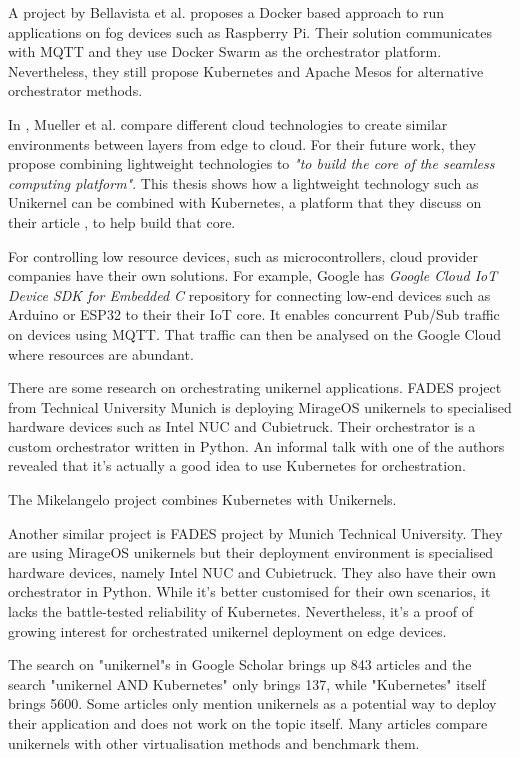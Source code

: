 A project by Bellavista et al. \cite{Bellavista2017} proposes a Docker based approach to run applications on fog devices such as Raspberry Pi. Their solution communicates with MQTT and they use Docker Swarm as the orchestrator platform. Nevertheless, they still propose Kubernetes and Apache Mesos for alternative orchestrator methods.

In \cite{Mueller2017} , Mueller et al. compare different cloud technologies to create similar environments between layers from edge to cloud. For their future work, they propose combining lightweight technologies to \textit{"to build the core of the seamless computing platform"}. This thesis shows how a lightweight technology such as Unikernel can be combined with Kubernetes, a platform that they discuss on their article , to help build that core.

For controlling low resource devices, such as microcontrollers, cloud provider companies have their own solutions. For example, Google has \textit{Google Cloud IoT Device SDK for Embedded C} repository for connecting low-end devices such as Arduino or ESP32 to their their IoT core. It enables concurrent Pub/Sub traffic on devices using MQTT. That traffic can then be analysed on the Google Cloud where resources are abundant.

There are some research on orchestrating unikernel applications. FADES project \cite{fades} from Technical University Munich is deploying MirageOS unikernels to specialised hardware devices such as Intel NUC and Cubietruck. Their orchestrator is a custom orchestrator written in Python. An informal talk with one of the authors revealed that it's actually a good idea to use Kubernetes for orchestration.

The Mikelangelo project \cite{Struckmann2018} combines Kubernetes with Unikernels.
\iffalse

Another similar project is FADES \cite{fades} project by Munich Technical University. They are using MirageOS unikernels but their deployment environment is specialised hardware devices, namely Intel NUC and Cubietruck. They also have their own orchestrator in Python. While it's better customised for their own scenarios, it lacks the battle-tested reliability of Kubernetes. Nevertheless, it's a proof of growing interest for orchestrated unikernel deployment on edge devices.


 The search on "unikernel"s in Google Scholar brings up 843 articles and the search "unikernel AND Kubernetes" only brings 137, while "Kubernetes" itself brings 5600. Some articles only mention unikernels as a potential way to deploy their application and does not work on the topic itself. Many articles compare unikernels with other virtualisation methods and benchmark them.

